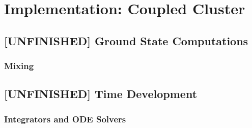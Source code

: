 \chapter{Implementation: Coupled Cluster}

\section{[UNFINISHED] Ground State Computations}

    

    

    

    

\subsection{Mixing}

    

    

\section{[UNFINISHED] Time Development}

    

    

    

\subsection{Integrators and ODE Solvers}

    

    

    